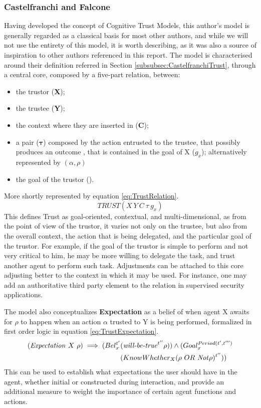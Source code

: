 \subsubsection{Castelfranchi and Falcone}
Having developed the concept of Cognitive Trust Models, this author's model is generally regarded as a classical basis for most other authors, and while we will not use the entirety of this model, it is worth describing, as it was also a source of inspiration to other authors referenced in this report. 
The model is characterised around their definition referred in Section \ref{subsubsec:CastelfranchiTrust}, through a central core, composed by a five-part relation, between:
\begin{itemize}
	\item the trustor (\textbf{X});
	\item the trustee (\textbf{Y});
	\item the context where they are inserted in (\textbf{C});
	\item a pair ($\bm{\tau}$) composed by the action \bm{$\alpha$} entrusted to the trustee, that possibly produces an outcome \bm{$\rho$}, that is contained in the goal of X ($g_x$); alternatively represented by $(\alpha, \rho)$
	\item the goal of the trustor ().
\end{itemize}
More shortly represented by equation \ref{eq:TrustRelation}.
\begin{equation}
TRUST(X\ Y\ C\ \tau\ g_x)
\label{eq:TrustRelation}
\end{equation}
This defines Trust as goal-oriented, contextual, and multi-dimensional, as from the point of view of the trustor, it varies not only on the trustee, but also from the overall context, the action that is being delegated, and the particular goal of the trustor. For example, if the goal of the trustor is simple to perform and not very critical to him, he may be more willing to delegate the task, and trust another agent to perform such task. Adjustments can be attached to this core adjusting better to the context in which it may be used. For instance, one may add an authoritative third party element to the relation in supervised security applications.

The model also conceptualizes \textbf{Expectation} as a belief of when agent X awaits for $\rho$ to happen when an action $\alpha$ trusted to Y is being performed, formalized in first order logic in equation \ref{eq:TrustExpectation}.
\begin{equation}
	\begin{aligned}
		(\text{\textit{Expectation}}\ X\ \rho) \implies (Bel_x^{t'} &(\text{\textit{will-be-true}} ^ {t''} \rho)) \wedge (Goal_x^{Period(t', t''')} \\
														&(KnowWhether_X (\rho\ OR\ \text{\textit{Not}} \rho)^{t''}))
	\end{aligned}
	\label{eq:TrustExpectation}
\end{equation}
This can be used to establish what expectations the user should have in the agent, whether initial or constructed during interaction, and provide an additional measure to weight the importance of certain agent functions and actions.



